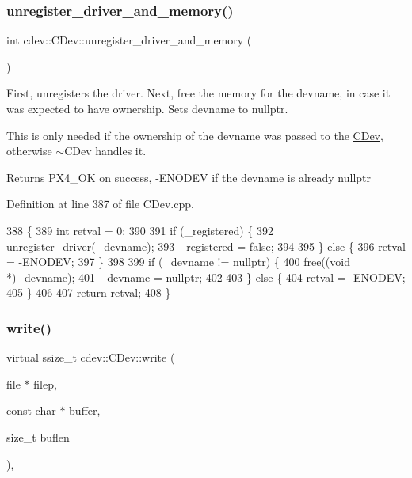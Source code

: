 \subsubsection{\texorpdfstring{unregister\+\_\+driver\+\_\+and\+\_\+memory()}{unregister\_driver\_and\_memory()}}
{\footnotesize\ttfamily int cdev\+::\+C\+Dev\+::unregister\+\_\+driver\+\_\+and\+\_\+memory (\begin{DoxyParamCaption}{ }\end{DoxyParamCaption})\hspace{0.3cm}{\ttfamily [protected]}}

First, unregisters the driver. Next, free the memory for the devname, in case it was expected to have ownership. Sets devname to nullptr.

This is only needed if the ownership of the devname was passed to the \hyperlink{classcdev_1_1CDev}{C\+Dev}, otherwise $\sim$\+C\+Dev handles it.

\begin{DoxyReturn}{Returns}
P\+X4\+\_\+\+OK on success, -\/\+E\+N\+O\+D\+EV if the devname is already nullptr 
\end{DoxyReturn}


Definition at line 387 of file C\+Dev.\+cpp.


\begin{DoxyCode}
388 \{
389     \textcolor{keywordtype}{int} retval = 0;
390 
391     \textcolor{keywordflow}{if} (\_registered) \{
392         unregister\_driver(\_devname);
393         \_registered = \textcolor{keyword}{false};
394 
395     \} \textcolor{keywordflow}{else} \{
396         retval = -ENODEV;
397     \}
398 
399     \textcolor{keywordflow}{if} (\_devname != \textcolor{keyword}{nullptr}) \{
400         free((\textcolor{keywordtype}{void} *)\_devname);
401         \_devname = \textcolor{keyword}{nullptr};
402 
403     \} \textcolor{keywordflow}{else} \{
404         retval = -ENODEV;
405     \}
406 
407     \textcolor{keywordflow}{return} retval;
408 \}
\end{DoxyCode}
\mbox{\label{classcdev_1_1CDev_a54aff43049b22cea19f8cc31cb2a0fd0}} 
\subsubsection{\texorpdfstring{write()}{write()}}
{\footnotesize\ttfamily virtual ssize\+\_\+t cdev\+::\+C\+Dev\+::write (\begin{DoxyParamCaption}\item[{file $\ast$}]{filep,  }\item[{const char $\ast$}]{buffer,  }\item[{size\+\_\+t}]{buflen }\end{DoxyParamCaption})\hspace{0.3cm}{\ttfamily [inline]}, {\ttfamily [virtual]}}

